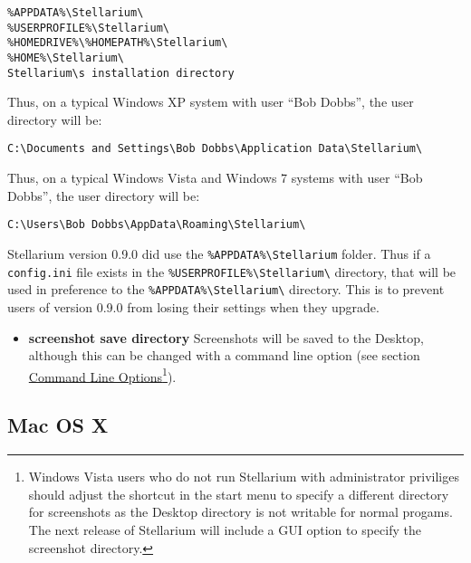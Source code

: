 \texttt{\%APPDATA\%\textbackslash{}Stellarium\textbackslash{}}\\
\texttt{\%USERPROFILE\%\textbackslash{}Stellarium\textbackslash{}}\\
\texttt{\%HOMEDRIVE\%\textbackslash{}\%HOMEPATH\%\textbackslash{}Stellarium\textbackslash{}}\\
\texttt{\%HOME\%\textbackslash{}Stellarium\textbackslash{}}\\
\texttt{Stellarium\textbackslash{}s~installation~directory}


Thus, on a typical Windows XP system with user ``Bob Dobbs'', the user
directory will be:

\texttt{C:\textbackslash{}Documents~and~Settings\textbackslash{}Bob~Dobbs\textbackslash{}Application~Data\textbackslash{}Stellarium\textbackslash{}}

Thus, on a typical Windows Vista and Windows 7 systems with user ``Bob
Dobbs'', the user directory will be:

\texttt{C:\textbackslash{}Users\textbackslash{}Bob~Dobbs\textbackslash{}AppData\textbackslash{}Roaming\textbackslash{}Stellarium\textbackslash{}}

Stellarium version 0.9.0 did use the
\texttt{\%APPDATA\%\textbackslash{}Stellarium} folder. Thus if a
\texttt{config.ini} file exists in the
\texttt{\%USERPROFILE\%\textbackslash{}Stellarium\textbackslash{}}
directory, that will be used in preference to the
\texttt{\%APPDATA\%\textbackslash{}Stellarium\textbackslash{}}
directory. This is to prevent users of version 0.9.0 from losing their
settings when they upgrade.

\begin{itemize}
\item
  \textbf{screenshot save directory} Screenshots will be saved to the
  Desktop, although this can be changed with a command line option (see
  section \href{Advanced_Use\#Command_Line_Options}{Command Line
  Options}\footnote{Windows Vista users who do not run Stellarium with
    administrator priviliges should adjust the shortcut in the start
    menu to specify a different directory for screenshots as the Desktop
    directory is not writable for normal progams. The next release of
    Stellarium will include a GUI option to specify the screenshot
    directory.}).
\end{itemize}

\subsection{Mac OS X}\label{mac-os-x}

